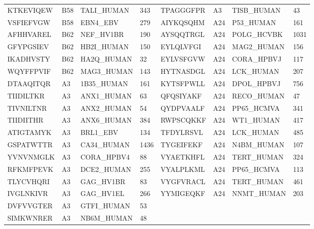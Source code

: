 \begin{table}[htp]
\begin{center}
\begin{sideways}
{\begin{tabulary}{1.5\textwidth}{|l|l|l|l|l|l|l|l|}
KTKEVIQEW & B58 & TALI\_HUMAN & 343 & TPAGGGFPR & A3 & TISB\_HUMAN & 43 \\
VSFIEFVGW & B58 & EBN4\_EBV & 279 & AIYKQSQHM & A24 & P53\_HUMAN & 161 \\
AFHHVAREL & B62 & NEF\_HV1BR & 190 & AYSQQTRGL & A24 & POLG\_HCVBK & 1031 \\
GFYPGSIEV & B62 & HB2I\_HUMAN & 150 & EYLQLVFGI & A24 & MAG2\_HUMAN & 156 \\
IKADHVSTY & B62 & HA2Q\_HUMAN & 32 & EYLVSFGVW & A24 & CORA\_HPBVJ & 117 \\
WQYFFPVIF & B62 & MAG3\_HUMAN & 143 & HYTNASDGL & A24 & LCK\_HUMAN & 207 \\
DTAAQITQR & A3 & 1B35\_HUMAN & 161 & KYTSFPWLL & A24 & DPOL\_HPBVJ & 756 \\
TIIDILTKR & A3 & ANX1\_HUMAN & 63 & QFQSIYAKF & A24 & RECO\_HUMAN & 47 \\
TIVNILTNR & A3 & ANX2\_HUMAN & 54 & QYDPVAALF & A24 & PP65\_HCMVA & 341 \\
TIIDIITHR & A3 & ANX6\_HUMAN & 384 & RWPSCQKKF & A24 & WT1\_HUMAN & 417 \\
ATIGTAMYK & A3 & BRL1\_EBV & 134 & TFDYLRSVL & A24 & LCK\_HUMAN & 485 \\
GSPATWTTR & A3 & CA34\_HUMAN & 1436 & TYGEIFEKF & A24 & N4BM\_HUMAN & 107 \\
YVNVNMGLK & A3 & CORA\_HPBV4 & 88 & VYAETKHFL & A24 & TERT\_HUMAN & 324 \\
RFKMFPEVK & A3 & DCE2\_HUMAN & 255 & VYALPLKML & A24 & PP65\_HCMVA & 113 \\
TLYCVHQRI & A3 & GAG\_HV1BR & 83 & VYGFVRACL & A24 & TERT\_HUMAN & 461 \\
IVGLNKIVR & A3 & GAG\_HV1EL & 266 & YYMIGEQKF & A24 & NNMT\_HUMAN & 203 \\
DVFVVGTER & A3 & GTFI\_HUMAN & 53 &  &  &  & \\
SIMKWNRER & A3 & NB6M\_HUMAN & 48 &  &  &  & \bigstrut[b] \\
\hline
\end{tabulary}
}
\end{sideways}
\end{center}
\end{table}





